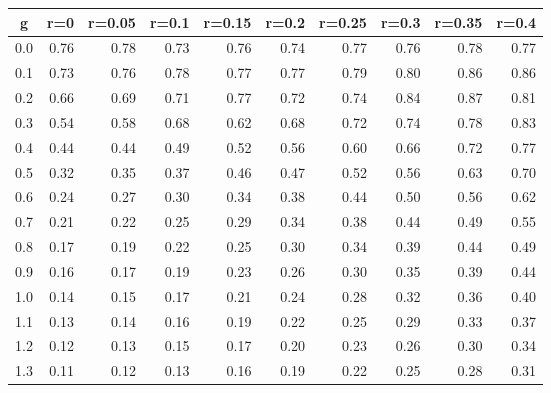 %
\begin{table}[!tbp]
 \begin{center}
 \begin{tabular}{rrrrrrrrrr}\hline\hline
\multicolumn{1}{c}{g}&\multicolumn{1}{c}{r=0}&\multicolumn{1}{c}{r=0.05}&\multicolumn{1}{c}{r=0.1}&\multicolumn{1}{c}{r=0.15}&\multicolumn{1}{c}{r=0.2}&\multicolumn{1}{c}{r=0.25}&\multicolumn{1}{c}{r=0.3}&\multicolumn{1}{c}{r=0.35}&\multicolumn{1}{c}{r=0.4}\tabularnewline
\hline
0.0&0.76&0.78&0.73&0.76&0.74&0.77&0.76&0.78&0.77\tabularnewline
0.1&0.73&0.76&0.78&0.77&0.77&0.79&0.80&0.86&0.86\tabularnewline
0.2&0.66&0.69&0.71&0.77&0.72&0.74&0.84&0.87&0.81\tabularnewline
0.3&0.54&0.58&0.68&0.62&0.68&0.72&0.74&0.78&0.83\tabularnewline
0.4&0.44&0.44&0.49&0.52&0.56&0.60&0.66&0.72&0.77\tabularnewline
0.5&0.32&0.35&0.37&0.46&0.47&0.52&0.56&0.63&0.70\tabularnewline
0.6&0.24&0.27&0.30&0.34&0.38&0.44&0.50&0.56&0.62\tabularnewline
0.7&0.21&0.22&0.25&0.29&0.34&0.38&0.44&0.49&0.55\tabularnewline
0.8&0.17&0.19&0.22&0.25&0.30&0.34&0.39&0.44&0.49\tabularnewline
0.9&0.16&0.17&0.19&0.23&0.26&0.30&0.35&0.39&0.44\tabularnewline
1.0&0.14&0.15&0.17&0.21&0.24&0.28&0.32&0.36&0.40\tabularnewline
1.1&0.13&0.14&0.16&0.19&0.22&0.25&0.29&0.33&0.37\tabularnewline
1.2&0.12&0.13&0.15&0.17&0.20&0.23&0.26&0.30&0.34\tabularnewline
1.3&0.11&0.12&0.13&0.16&0.19&0.22&0.25&0.28&0.31\tabularnewline
\hline
\end{tabular}

\end{center}

\end{table}

